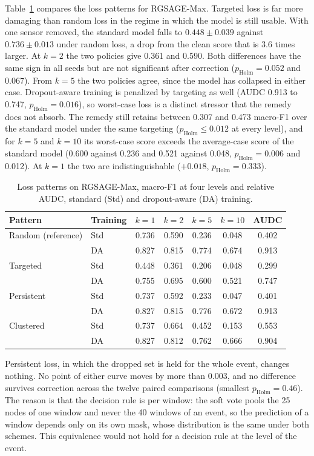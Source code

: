\documentclass[MTech]{ugthesis}
\begin{document}
Table~\ref{tab:patterns} compares the loss patterns for RGSAGE-Max. Targeted loss is far more damaging than random loss in the regime in which the model is still usable. With one sensor removed, the standard model falls to $0.448\pm0.039$ against $0.736\pm0.013$ under random loss, a drop from the clean score that is 3.6 times larger. At $k=2$ the two policies give 0.361 and 0.590. Both differences have the same sign in all seeds but are not significant after correction ($p_{\mathrm{Holm}}=0.052$ and 0.067). From $k=5$ the two policies agree, since the model has collapsed in either case. Dropout-aware training is penalized by targeting as well (\ac{AUDC} 0.913 to 0.747, $p_{\mathrm{Holm}}=0.016$), so worst-case loss is a distinct stressor that the remedy does not absorb. The remedy still retains between 0.307 and 0.473 macro-F1 over the standard model under the same targeting ($p_{\mathrm{Holm}}\le0.012$ at every level), and for $k=5$ and $k=10$ its worst-case score exceeds the average-case score of the standard model (0.600 against 0.236 and 0.521 against 0.048, $p_{\mathrm{Holm}}=0.006$ and 0.012). At $k=1$ the two are indistinguishable ($+0.018$, $p_{\mathrm{Holm}}=0.333$).

\begin{table}[htbp]
\caption{Loss patterns on RGSAGE-Max, macro-F1 at four levels and relative \acs{AUDC}, standard (Std) and dropout-aware (DA) training.}
\label{tab:patterns}
\small
\centering
\begin{tabular}{@{}llccccc@{}}
\toprule
Pattern & Training & $k=1$ & $k=2$ & $k=5$ & $k=10$ & AUDC \\
\midrule
Random (reference) & Std & 0.736 & 0.590 & 0.236 & 0.048 & 0.402 \\
 & DA & 0.827 & 0.815 & 0.774 & 0.674 & 0.913 \\
Targeted & Std & 0.448 & 0.361 & 0.206 & 0.048 & 0.299 \\
 & DA & 0.755 & 0.695 & 0.600 & 0.521 & 0.747 \\
Persistent & Std & 0.737 & 0.592 & 0.233 & 0.047 & 0.401 \\
 & DA & 0.827 & 0.815 & 0.776 & 0.672 & 0.913 \\
Clustered & Std & 0.737 & 0.664 & 0.452 & 0.153 & 0.553 \\
 & DA & 0.827 & 0.812 & 0.762 & 0.666 & 0.904 \\
\bottomrule
\end{tabular}
\end{table}

Persistent loss, in which the dropped set is held for the whole event, changes nothing. No point of either curve moves by more than 0.003, and no difference survives correction across the twelve paired comparisons (smallest $p_{\mathrm{Holm}}=0.46$). The reason is that the decision rule is per window: the soft vote pools the 25 nodes of one window and never the 40 windows of an event, so the prediction of a window depends only on its own mask, whose distribution is the same under both schemes. This equivalence would not hold for a decision rule at the level of the event.
\end{document}
